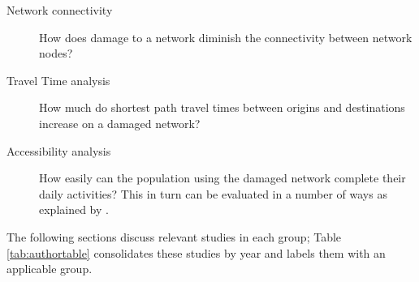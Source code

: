 \begin{description}
	\item [Network connectivity] {How does damage to a network
	diminish the connectivity
between network nodes?}
	\item [Travel Time analysis] {How much do shortest path travel
	times between origins
and destinations increase on a damaged network?}
	\item [Accessibility analysis] {How easily can the population
	using the damaged
network complete their daily activities? This in turn can be evaluated in a number of ways as explained by \citet{dong2006}.}
\end{description}

The following sections discuss relevant studies in each group; Table
\ref{tab:authortable} consolidates these studies by year and labels them
with
an applicable group.

